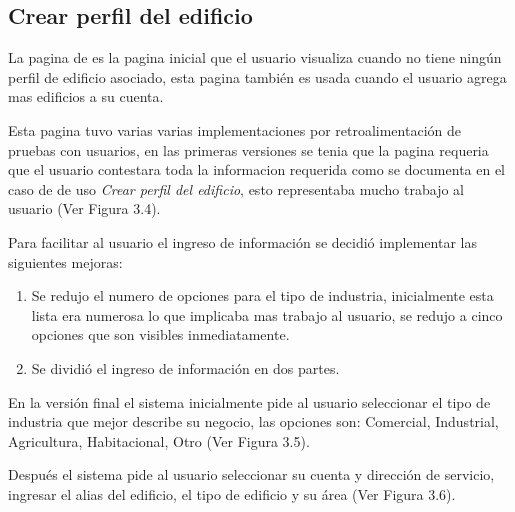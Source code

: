 
\subsection{Crear perfil del edificio}

La pagina de  es la pagina inicial
que el usuario visualiza cuando no tiene ningún perfil de edificio asociado,
esta pagina también es usada cuando el usuario agrega mas edificios a su
cuenta.

Esta pagina tuvo varias varias implementaciones por retroalimentación de
pruebas con usuarios, en las primeras versiones se tenia que la pagina
requeria que el usuario contestara toda la informacion requerida como se
documenta en el caso de de uso \textit{Crear perfil del edificio}, esto
representaba mucho trabajo al usuario (Ver Figura 3.4).


Para facilitar al usuario el ingreso de información se decidió implementar
las siguientes mejoras:

\begin{enumerate}
\item Se redujo el numero de opciones para el tipo de industria, inicialmente
  esta lista era numerosa lo que implicaba mas trabajo al usuario, se redujo
  a cinco opciones que son visibles inmediatamente.
\item Se dividió el ingreso de información en dos partes.
\end{enumerate}

En la versión final el sistema inicialmente pide al usuario seleccionar el tipo
de industria que mejor describe su negocio, las opciones son: Comercial, Industrial,
Agricultura, Habitacional, Otro (Ver Figura 3.5).


Después el sistema pide al usuario seleccionar su cuenta y dirección
de servicio, ingresar el alias del edificio, el tipo de edificio y su área
(Ver Figura 3.6).


